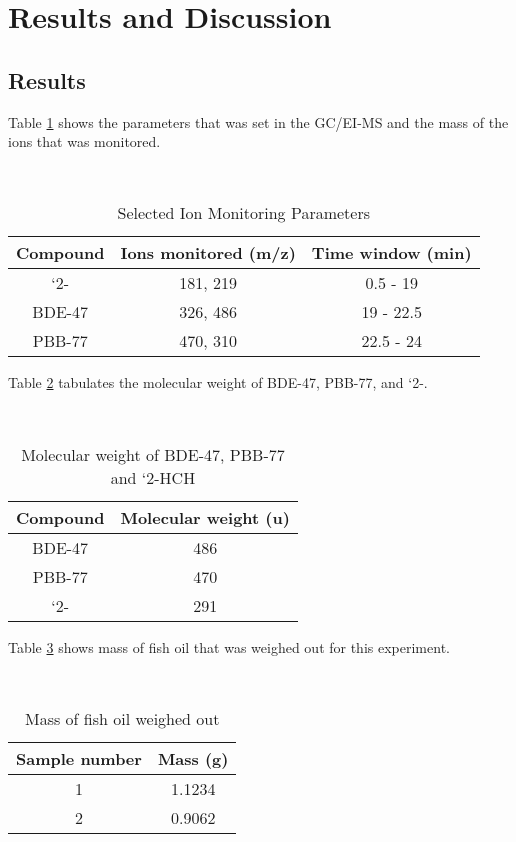 \documentclass[a4paper, 12pt]{article}
\begin{document}

\section{Results and Discussion}

\subsection{Results}
Table \ref{tab-para} shows the parameters that was set in the GC/EI-MS and the mass of the ions that was monitored.

\begin{table}[h!]
	\centering
	\caption{Selected Ion Monitoring Parameters}
	\hfill \\
	\begin{tabular}{|c|c|c|}
		\hline
		Compound & Ions monitored (m/z) & Time window (min) \\
		\hline
		`2-\ce{HCH} & 181, 219 & 0.5 - 19 \\
		\hline
		BDE-47 & 326, 486 & 19 - 22.5 \\
		\hline
		PBB-77 & 470, 310 & 22.5 - 24 \\
		\hline
	\end{tabular}
	\label{tab-para}
\end{table}

Table \ref{tab-mass} tabulates the molecular weight of BDE-47, PBB-77, and `2-.

\begin{table}[h!]
	\centering
	\caption{Molecular weight of BDE-47, PBB-77 and `2-HCH}
	\hfill \\
	\begin{tabular}{|c|c|}
		\hline
		Compound & Molecular weight (\si{\amu}) \\
		\hline
		BDE-47 & 486 \\
		\hline
		PBB-77 & 470 \\
		\hline
		`2-\ce{HCH} & 291 \\
		\hline
	\end{tabular}
	\label{tab-mass}
\end{table}

Table \ref{tab-fish} shows mass of fish oil that was weighed out for this experiment.

\begin{table}[h!]
	\centering
	\caption{Mass of fish oil weighed out}
	\hfill \\
	\begin{tabular}{|c|c|}
		\hline
		Sample number & Mass (\si{\gram}) \\
		\hline
		1 & 1.1234 \\
		\hline
		2 & 0.9062 \\
		\hline
	\end{tabular}
	\label{tab-fish}
\end{table}
\end{document}
